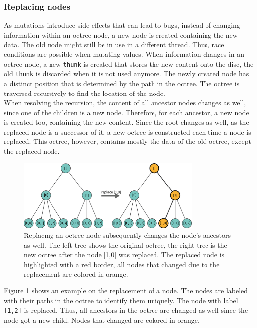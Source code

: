 \subsubsection{Replacing nodes}

As mutations introduce side effects that can lead to bugs, instead of changing information within an octree node, a new node is created containing the new data. The old node might still be in use in a different thread. Thus, race conditions are possible when mutating values. When information changes in an octree node, a new \verb|thunk| is created that stores the new content onto the disc, the old \verb|thunk| is discarded when it is not used anymore. The newly created node has a distinct position that is determined by the path in the octree. The octree is traversed recursively to find the location of the node. 
\\
When resolving the recursion, the content of all ancestor nodes changes as well, since one of the children is a new node. Therefore, for each ancestor, a new node is created too, containing the new content. Since the root changes as well, as the replaced node is a successor of it, a new octree is constructed each time a node is replaced. This octree, however, contains mostly the data of the old octree, except the replaced node. 

\begin{figure}[h]
    \centering
    \includegraphics[width=0.8\textwidth]{Implementation/octreeReplace.png}
    \caption{Replacing an octree node subsequently changes the node's ancestors as well. The left tree shows the original octree, the right tree is the new octree after the node [1,0] was replaced. The replaced node is highlighted with a red border, all nodes that changed due to the replacement are colored in orange. }
    \label{fig:octreeReplace}
\end{figure}

Figure \ref{fig:octreeReplace} shows an example on the replacement of a node. The nodes are labeled with their paths in the octree to identify them uniquely. The node with label \verb|[1,2]| is replaced. Thus, all ancestors in the octree are changed as well since the node got a new child. Nodes that changed are colored in orange. 


